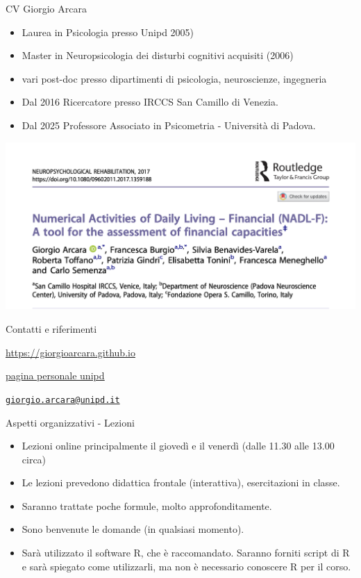 \documentclass[
  ignorenonframetext,
]{beamer}
\providecommand{\tightlist}{%
  \setlength{\itemsep}{0pt}\setlength{\parskip}{0pt}}
\begin{document}
\begin{frame}{CV Giorgio Arcara}
\label{cv-giorgio-arcara}
\footnotesize

\begin{itemize}
\item
  Laurea in Psicologia presso Unipd 2005)
\item
  Master in Neuropsicologia dei disturbi cognitivi acquisiti (2006)
\item
  vari post-doc presso dipartimenti di psicologia, neuroscienze,
  ingegneria
\item
  Dal 2016 Ricercatore presso IRCCS San Camillo di Venezia.
\item
  Dal 2025 Professore Associato in Psicometria - Università di Padova.
\end{itemize}

\pause

\hfill
\includegraphics[width=0.6\linewidth,height=\textheight,keepaspectratio]{Figures/NADL_F.png}
\end{frame}

\begin{frame}{Contatti e riferimenti}
\label{contatti-e-riferimenti}
\centering

\href{https://giorgioarcara.github.io}{\ul{https://giorgioarcara.github.io}}

\href{https://www.dpg.unipd.it/category/ruoli/personale-docente?key=4D0707A2DD6FCCD50B90E4C9F316A625}{\ul{pagina
personale unipd}}

\href{mailto:giorgio.arcara@unipd.it}{\nolinkurl{giorgio.arcara@unipd.it}}
\end{frame}

\begin{frame}{Aspetti organizzativi - Lezioni}
\label{aspetti-organizzativi---lezioni}
\begin{itemize}
\tightlist
\item
  Lezioni online principalmente il giovedì e il venerdì (dalle 11.30
  alle 13.00 circa)
\item
  Le lezioni prevedono didattica frontale (interattiva), esercitazioni
  in classe.
\item
  Saranno trattate poche formule, molto approfonditamente.
\item
  Sono benvenute le domande (in qualsiasi momento).
\item
  Sarà utilizzato il software R, che è raccomandato. Saranno forniti
  script di R e sarà spiegato come utilizzarli, ma non è necessario
  conoscere R per il corso.
\end{itemize}
\end{frame}
\end{document}

